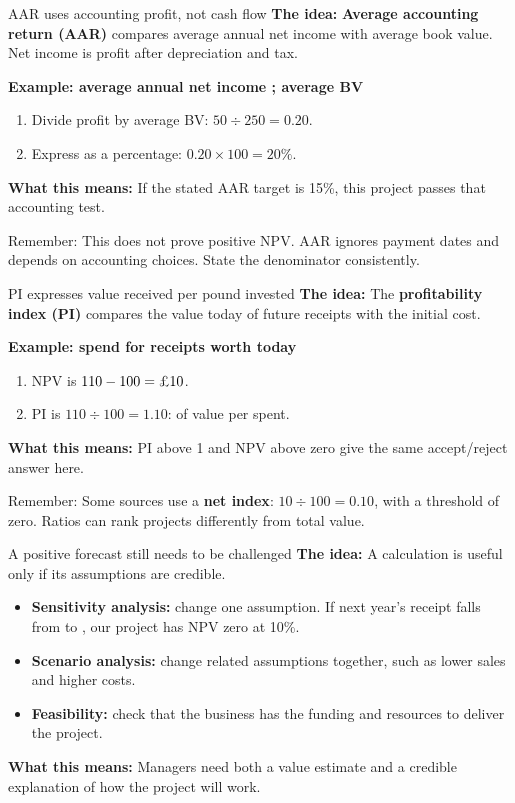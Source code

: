 \documentclass[10pt,aspectratio=169]{beamer}
\newcommand{\idea}[1]{\textbf{The idea:} #1\par\smallskip}
\newcommand{\inpractice}[1]{\par\smallskip\textbf{What this means:} #1}
\newcommand{\remember}[1]{\par\smallskip\alert{Remember:} #1}
\renewcommand{\pounds}{\ifmmode\text{\textsterling}\else\textsterling\fi}
\begin{document}
\begin{frame}{AAR uses accounting profit, not cash flow}
\idea{\textbf{Average accounting return (AAR)} compares average annual net income with average book value. Net income is profit after depreciation and tax.}
\textbf{Example: average annual net income \pounds50; average BV \pounds250}
\begin{enumerate}
\item Divide profit by average BV: $50\div250=0.20$.
\item Express as a percentage: $0.20\times100=20\%$.
\end{enumerate}
\inpractice{If the stated AAR target is 15\%, this project passes that accounting test.}
\remember{This does not prove positive NPV. AAR ignores payment dates and depends on accounting choices. State the denominator consistently.}
\end{frame}

\begin{frame}{PI expresses value received per pound invested}
\idea{The \textbf{profitability index (PI)} compares the value today of future receipts with the initial cost.}
\textbf{Example: spend \pounds100 for receipts worth \pounds110 today}
\begin{enumerate}
\item NPV is $110-100=\pounds10$.
\item PI is $110\div100=1.10$: \pounds1.10 of value per \pounds1 spent.
\end{enumerate}
\inpractice{PI above 1 and NPV above zero give the same accept/reject answer here.}
\remember{Some sources use a \textbf{net index}: $10\div100=0.10$, with a threshold of zero. Ratios can rank projects differently from total value.}
\end{frame}

\begin{frame}{A positive forecast still needs to be challenged}
\idea{A calculation is useful only if its assumptions are credible.}
\begin{itemize}
\item \textbf{Sensitivity analysis:} change one assumption. If next year's receipt falls from \pounds121 to \pounds110, our \pounds100 project has NPV zero at 10\%.
\item \textbf{Scenario analysis:} change related assumptions together, such as lower sales and higher costs.
\item \textbf{Feasibility:} check that the business has the funding and resources to deliver the project.
\end{itemize}
\inpractice{Managers need both a value estimate and a credible explanation of how the project will work.}
\end{frame}
\end{document}
